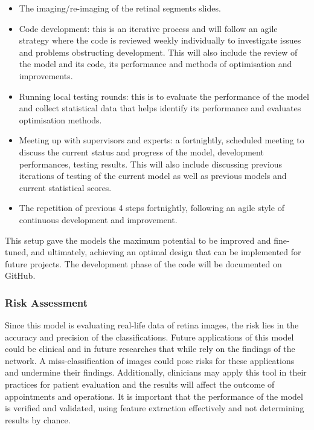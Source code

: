 \documentclass[a4paper]{article}
\begin{document}
        \begin{itemize}
            \item The imaging/re-imaging of the retinal segments slides. 
            \item Code development: this is an iterative process and will follow an agile strategy where the code is reviewed weekly individually to investigate issues and problems obstructing development. This will also include the review of the model and its code, its performance and methods of optimisation and improvements.
            \item Running local testing rounds: this is to evaluate the performance of the model and collect statistical data that helps identify its performance and evaluates optimisation methods.
            \item Meeting up with supervisors and experts: a fortnightly, scheduled meeting to discuss the current status and progress of the model, development performances, testing results. This will also include discussing previous iterations of testing of the current model as well as previous models and current statistical scores. 
            \item The repetition of previous 4 steps fortnightly, following an agile style of continuous development and improvement.
        \end{itemize}

        This setup gave the models the maximum potential to be improved and fine-tuned, and ultimately, achieving an optimal design that can be implemented for future projects. The development phase of the code will be documented on GitHub.
        \vspace{6mm}
       

    \subsubsection{Risk Assessment}
        Since this model is evaluating real-life data of retina images, the risk lies in the accuracy and precision of the classifications. Future applications of this model could be clinical and in future researches that while rely on the findings of the network. A miss-classification of images could pose risks for these applications and undermine their findings. Additionally, clinicians may apply this tool in their practices for patient evaluation and the results will affect the outcome of appointments and operations. It is important that the performance of the model is verified and validated, using feature extraction effectively and not determining results by chance.
\end{document}
